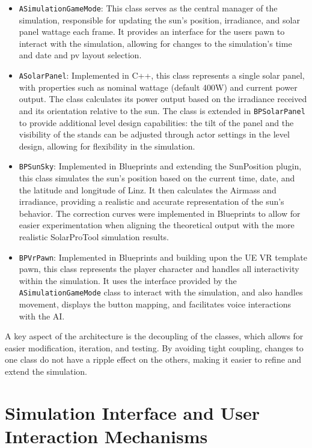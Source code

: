 \documentclass[draft, final]{vutinfth} %
\begin{document}
\begin{itemize}
    \item \lstinline|ASimulationGameMode|: This class serves as the central manager of the simulation, responsible for updating the sun's position, irradiance, and solar panel wattage each frame. It provides an interface for the users pawn to interact with the simulation, allowing for changes to the simulation's time and date and pv layout selection.
    \item \lstinline|ASolarPanel|: Implemented in C++, this class represents a single solar panel, with properties such as nominal wattage (default 400W) and current power output. The class calculates its power output based on the irradiance received and its orientation relative to the sun. The class is extended in \lstinline|BPSolarPanel| to provide additional level design capabilities: the tilt of the panel and the visibility of the stands can be adjusted through actor settings in the level design, allowing for flexibility in the simulation.
    \item \lstinline|BPSunSky|: Implemented in Blueprints and extending the SunPosition plugin, this class simulates the sun's position based on the current time, date, and the latitude and longitude of Linz. It then calculates the Airmass and irradiance, providing a realistic and accurate representation of the sun's behavior. The correction curves were implemented in Blueprints to allow for easier experimentation when aligning the theoretical output with the more realistic SolarProTool simulation results.
    \item \lstinline|BPVrPawn|: Implemented in Blueprints and building upon the UE VR template pawn, this class represents the player character and handles all interactivity within the simulation. It uses the interface provided by the \lstinline|ASimulationGameMode| class to interact with the simulation, and also handles movement, displays the button mapping, and facilitates voice interactions with the AI.
\end{itemize}

A key aspect of the architecture is the decoupling of the classes, which allows for easier modification, iteration, and testing. By avoiding tight coupling, changes to one class do not have a ripple effect on the others, making it easier to refine and extend the simulation.

\section{Simulation Interface and User Interaction Mechanisms}
\end{document}
